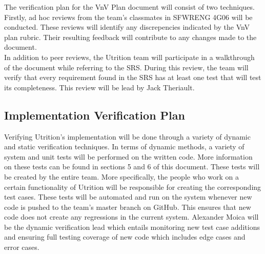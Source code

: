 \documentclass[12pt, titlepage]{article}
\begin{document}
	
	
	
	The verification plan for the VnV Plan document will consist of two techniques. Firstly, ad hoc reviews from the team's classmates in SFWRENG 4G06 will be conducted. These reviews will identify any discrepencies indicated by the VnV plan rubric. Their resulting feedback will contribute to any changes made to the document.\\
	
	In addition to peer reviews, the Utrition team will participate in a walkthrough of the document while referring to the SRS. During this review, the team will verify that every requirement found in the SRS has at least one test that will test its completeness. This review will be lead by Jack Theriault. 
	
	\subsection{Implementation Verification Plan}
	
	
	
	Verifying Utrition's implementation will be done through a variety of dynamic and static verification techniques. In terms of dynamic methods, a variety of system and unit tests will be performed on the written code. More information on these tests can be found in sections 5 and 6 of this document. These tests will be created by the entire team. More specifically, the people who work on a certain functionality of Utrition will be responsible for creating the corresponding test cases. These tests will be automated and run on the system whenever new code is pushed to the team's master branch on GitHub. This ensures that new code does not create any regressions in the current system. Alexander Moica will be the dynamic verification lead which entails monitoring new test case additions and ensuring full testing coverage of new code which includes edge cases and error cases.\\
	
\end{document}
